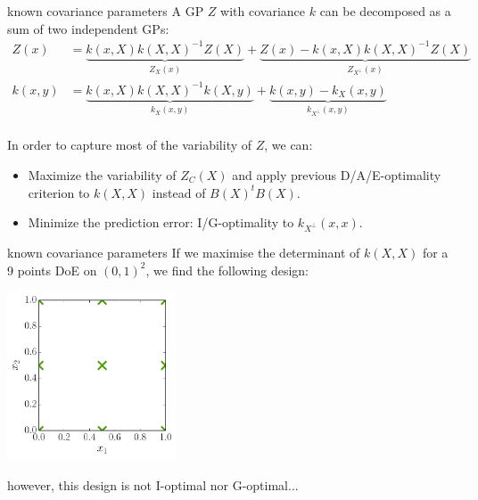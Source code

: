 \documentclass{beamer}
\begin{document}
\begin{frame}{known covariance parameters}
A GP $Z$ with covariance $k$ can be decomposed as a sum of two independent GPs:
\begin{equation*}
	\begin{split}
	Z(x) & = \underbrace{k(x,X)k(X,X)^{-1}Z(X)}_{Z_X(x)} + \underbrace{Z(x) - k(x,X)k(X,X)^{-1}Z(X)}_{Z_{X^\perp}(x)}\\
	k(x,y) &= \underbrace{k(x,X)k(X,X)^{-1}k(X,y)}_{k_X(x,y)} + \underbrace{k(x,y) - k_X(x,y)}_{k_{X^\perp}(x,y)}
	\end{split}
\end{equation*}
\ \\ 
In order to capture most of the variability of $Z$, we can:
\begin{itemize}
	\item Maximize the variability of $Z_C(X)$ and apply previous D/A/E-optimality criterion to $k(X,X)$ instead of $B(X)^tB(X)$.
	\item Minimize the prediction error: I/G-optimality to $k_{X^\perp}(x,x)$.
\end{itemize}
\end{frame}

\begin{frame}{known covariance parameters}
If we maximise the determinant of $k(X,X)$ for a 9 points DoE on $(0,1)^2$, we find the following design:
\begin{center}
\includegraphics[height=5cm]{figures/python/opt_XD}
\end{center}
however, this design is not I-optimal nor G-optimal... 
\end{frame}
\end{document}
